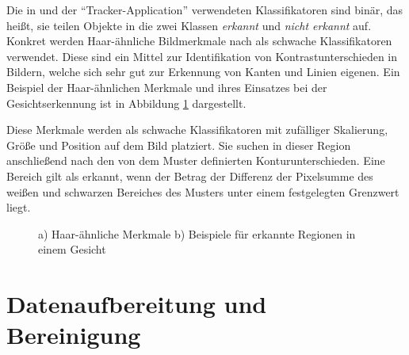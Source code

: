 Die in \cite[]{Grabner} und der ``Tracker-Application'' verwendeten Klassifikatoren sind binär, das heißt,
sie teilen Objekte in die zwei Klassen \textit{erkannt} und \textit{nicht erkannt} auf.
Konkret werden Haar-ähnliche Bildmerkmale nach \cite[]{Viola} als schwache Klassifikatoren verwendet.
Diese sind ein Mittel zur Identifikation von Kontrastunterschieden in Bildern, welche sich sehr gut
zur Erkennung von Kanten und Linien eigenen. Ein Beispiel der Haar-ähnlichen Merkmale und ihres Einsatzes
bei der Gesichtserkennung ist in Abbildung \ref{fig:grund_hair_like} dargestellt.

Diese Merkmale werden als schwache Klassifikatoren mit zufälliger Skalierung, Größe und Position
auf dem Bild platziert. Sie suchen in dieser Region anschließend nach den von dem Muster definierten
Konturunterschieden. Eine Bereich gilt als erkannt, wenn der Betrag der Differenz der Pixelsumme des weißen und
schwarzen Bereiches des Musters unter einem festgelegten Grenzwert liegt.

\begin{figure}[H]
    \centering
    \qquad
    \caption{a) Haar-ähnliche Merkmale b) Beispiele für erkannte Regionen in einem Gesicht \cite[]{DivyanshDwivedi2018}}
    \label{fig:grund_hair_like}
\end{figure}

\section{Datenaufbereitung und Bereinigung}
\label{sec:tra_preprocessing}


